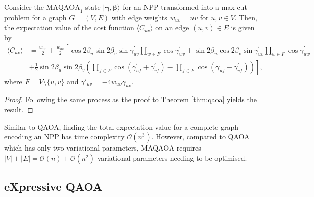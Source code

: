     \begin{widetext}
    \begin{theorem} \label{thm:maqaoa}
        Consider the $\mathrm{MAQAOA}_1$ state $|\mathbf{\gamma,\beta}\rangle$ for an NPP transformed into a max-cut problem for a graph $G=(V,E)$ with edge weights $w_{uv}=uv$ for $u,v\in V$. Then, the expectation value of the cost function $\langle C_{uv}\rangle$ on an edge $(u,v)\in E$ is given by
        \begin{align*}
            \langle C_{u v}\rangle & =\frac{w_{u v}}{2}+\frac{w_{u v}}{2}\left[\cos 2 \beta_u \sin 2 \beta_v \sin \gamma_{u v}^{\prime} \prod_{w \in F} \cos \gamma_{w v}^{\prime}+\sin 2 \beta_u \cos 2 \beta_v \sin \gamma_{u v}^{\prime} \prod_{w \in F} \cos \gamma_{u w}^{\prime}\right. \\ 
            & \left.+\frac{1}{2} \sin 2 \beta_u \sin 2 \beta_v \left(\prod_{f \in F} \cos \left(\gamma_{u f}^{\prime}+\gamma_{v f}^{\prime}\right)-\prod_{f \in F} \cos \left(\gamma_{u f}-\gamma_{v f}^{\prime}\right)\right)\right],
        \end{align*}
        where $F = V\setminus\{u,v\}$ and $\gamma'_{uv} = -4w_{uv}\gamma_{uv}$.
    \end{theorem}
    \end{widetext}
    \begin{proof}
        Following the same process as the proof to Theorem \ref{thm:qaoa} yields the result.
    \end{proof}
    
    Similar to QAOA, finding the total expectation value for a complete graph encoding an NPP has time complexity $\mathcal{O}(n^3)$. However, compared to QAOA which has only two variational parameters, MAQAOA requires $|V|+|E|=\mathcal{O}(n)+\mathcal{O}(n^2)$ variational parameters needing to be optimised.

\subsection{eXpressive QAOA}

